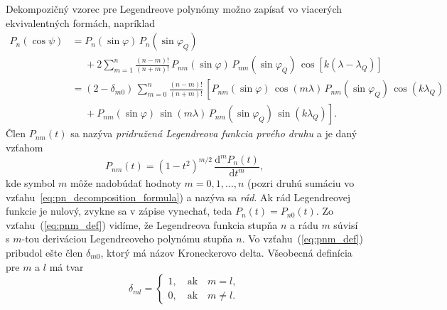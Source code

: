\documentclass[a4paper, 12pt]{book}
\newcommand{\diff}{\mathrm d}
\begin{document}
Dekompozičný vzorec pre Legendreove polynómy možno zapísať vo viacerých 
ekvivalentných formách, napríklad 
\citep{Hobson,MoritzPhysicalGeodesy,SansoGeoidDetermination}
%
\begin{equation}
\label{eq:pn_decomposition_formula}
\begin{split}
P_n(\cos\psi) &= P_n(\sin\varphi) \, P_n(\sin\varphi_Q)\\
%
&\phantom{={}} +2 \sum_{m = 1}^{n} \frac{(n - m)!}{(n + m)!} \, 
P_{nm}(\sin\varphi) \, P_{nm}(\sin\varphi_Q) \, \cos\left[k (\lambda 
- \lambda_Q) \right]\\
%
&= (2 - \delta_{m0}) \, \sum_{m = 0}^{n} \frac{(n - m)!}{(n + m)!} \, \left[ 
P_{nm}(\sin\varphi) \, \cos(m\lambda) \, P_{nm}(\sin\varphi_Q) \, 
\cos(k\lambda_Q)\right.\\
%
&\phantom{={}}+\left. P_{nm}(\sin\varphi) \, \sin(m\lambda) \, 
P_{nm}(\sin\varphi_Q) \, \sin(k\lambda_Q)\right]{.}
\end{split}
\end{equation}
%
Člen $P_{nm}(t)$ sa nazýva \emph{pridružená Legendreova funkcia prvého druhu} 
a je daný vzťahom
%
\begin{equation}
\label{eq:pnm_def}
P_{nm}(t) = (1 - t^2)^{m \slash 2} \, \frac{\diff^m P_n(t)}{\diff t^m}{,}
\end{equation}
%
kde symbol $m$ môže nadobúdať hodnoty $m = 0, 1, \dots, n$ (pozri druhú sumáciu 
vo vzťahu~\ref{eq:pn_decomposition_formula}) a nazýva sa \emph{rád}.  Ak rád 
Legendreovej funkcie je nulový, zvykne sa v zápise vynechať, teda $P_n(t) 
= P_{n0}(t)$.  Zo vzťahu~(\ref{eq:pnm_def}) vidíme, že Legendreova funkcia 
stupňa $n$ a rádu $m$ súvisí s $m$-tou deriváciou Legendreoveho polynómu stupňa 
$n$.  Vo vzťahu~(\ref{eq:pnm_def}) pribudol ešte člen $\delta_{m0}$, ktorý má 
názov Kroneckerovo delta.  Všeobecná definícia pre $m$ a $l$ má tvar
%
\begin{equation}
\delta_{ml} =
%
\begin{cases}
1{,} \quad \mathrm{ak} \quad m = l{,}\\
0{,} \quad \mathrm{ak} \quad m \neq l{.}
\end{cases}
\end{equation}
\end{document}
